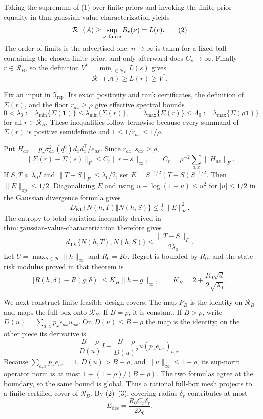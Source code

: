 Taking the supremum of (1) over finite priors and invoking the finite-prior equality in \(\mathrm{thm:gaussian\text{-}value\text{-}characterization}\) yields
\[
 \mathcal R_-(\mathcal A)\geq\sup_{\nu\ {\rm finite}}B_r(\nu)=L(r). \tag{2}
\]
The order of limits is the advertised one: \(n\to\infty\) is taken for a fixed ball containing the chosen finite prior, and only afterward does \(C_v\to\infty\).  Finally \(r\in\mathcal R_B\), so the definition \(V^*=\min_{s\in\mathcal R_B}L(s)\) gives
\[
 \mathcal R_-(\mathcal A)\geq L(r)\geq V^*.
\]

Fix an input in \(\mathfrak I_{\mathrm{rep}}\).  Its exact positivity and rank certificates, the definition of \(\Sigma(r)\), and the floor \(r_{ax}\geq\rho\) give effective spectral bounds
\[
 0<\lambda_0:=\lambda_{\min}\{\Sigma(\mathbf1)\}
 \leq\lambda_{\min}\{\Sigma(r)\},\qquad
 \lambda_{\max}\{\Sigma(r)\}\leq
 \Lambda_0:=\lambda_{\max}\{\Sigma(\rho\mathbf1)\}                \tag{1}
\]
for all \(r\in\mathcal R_B\).  These inequalities follow termwise because every summand of \(\Sigma(r)\) is positive semidefinite and \(1\leq1/r_{ax}\leq1/\rho\).

Put \(H_{ax}=p_x\sigma^2_{ax}(q^0)d_xd_x^\top/e_{ax}\).  Since \(r_{ax},s_{ax}\geq\rho\),
\[
 \lVert\Sigma(r)-\Sigma(s)\rVert_F
 \leq C_r\lVert r-s\rVert_\infty,\qquad
 C_r=\rho^{-2}\sum_{a,x}\lVert H_{ax}\rVert_F.                     \tag{2}
\]
If \(S,T\succeq\lambda_0I\) and \(\lVert T-S\rVert_F\leq\lambda_0/2\), set \(E=S^{-1/2}(T-S)S^{-1/2}\).  Then \(\lVert E\rVert_{\mathrm{op}}\leq1/2\).  Diagonalizing \(E\) and using \(u-\log(1+u)\leq u^2\) for \(|u|\leq1/2\) in the Gaussian divergence formula gives
\[
 D_{\mathrm{KL}}\{N(h,T)\Vert N(h,S)\}\leq\tfrac12\lVert E\rVert_F^2.
\]
The entropy-to-total-variation inequality derived in \(\mathrm{thm:gaussian\text{-}value\text{-}characterization}\) therefore gives
\[
 d_{\mathrm{TV}}\{N(h,T),N(h,S)\}
 \leq\frac{\lVert T-S\rVert_F}{2\lambda_0}.                         \tag{3}
\]
Let \(U=\max_{h\in\mathcal H}\lVert h\rVert_\infty\) and \(R_0=2U\).  Regret is bounded by \(R_0\), and the state-risk modulus proved in that theorem is
\[
 |R(h,\delta)-R(g,\delta)|\leq K_H\lVert h-g\rVert_\infty,\qquad
 K_H=2+\frac{R_0\sqrt d}{2\sqrt{\lambda_0}}.                        \tag{4}
\]

We next construct finite feasible design covers.  The map \(P_B\) is the identity on \(\mathcal R_B\) and maps the full box onto \(\mathcal R_B\).  If \(B=\rho\), it is constant.  If \(B>\rho\), write \(D(u)=\sum_{a,x}p_xe_{ax}u_{ax}\).  On \(D(u)\leq B-\rho\) the map is the identity; on the other piece its derivative is
\[
 \frac{B-\rho}{D(u)}I-
 \frac{B-\rho}{D(u)^2}u(p_xe_{ax})_{a,x}^{\top}.
\]
Because \(\sum_{a,x}p_xe_{ax}=1\), \(D(u)>B-\rho\), and \(\lVert u\rVert_\infty\leq1-\rho\), its sup-norm operator norm is at most \(1+(1-\rho)/(B-\rho)\).  The two formulas agree at the boundary, so the same bound is global.  Thus a rational full-box mesh projects to a finite certified cover of \(\mathcal R_B\).  By (2)--(3), covering radius \(\delta_r\) contributes at most
\[
 E_{\mathrm{des}}=\frac{R_0C_r\delta_r}{2\lambda_0}.                 \tag{5}
\]

